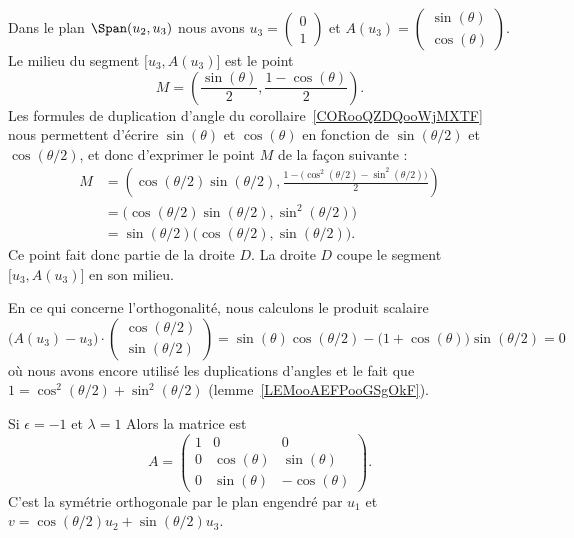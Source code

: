 \begin{subproof}
    Dans le plan \( \Span(u_2,u_3)\) nous avons \( u_3=\begin{pmatrix}
        0    \\
        1
    \end{pmatrix}\) et \( A(u_3)=\begin{pmatrix}
        \sin(\theta)    \\
        \cos(\theta)
    \end{pmatrix}\). Le milieu du segment \( \mathopen[ u_3 , A(u_3) \mathclose]\) est le point
    \begin{equation}
        M=\left( \frac{ \sin(\theta) }{2},\frac{ 1-\cos(\theta) }{2} \right).
    \end{equation}
    Les formules de duplication d'angle du corollaire~\ref{CORooQZDQooWjMXTF} nous permettent d'écrire \( \sin(\theta)\) et \( \cos(\theta)\) en fonction de \( \sin(\theta/2)\) et \( \cos(\theta/2)\), et donc d'exprimer le point \( M\) de la façon suivante :
    \begin{subequations}
        \begin{align}
            M&=\left( \cos(\theta/2)\sin(\theta/2),\frac{ 1-\big( \cos^2(\theta/2)-\sin^2(\theta/2) \big) }{2} \right)\\
            &=\big( \cos(\theta/2)\sin(\theta/2),\sin^2(\theta/2) \big)\\
            &=\sin(\theta/2)\big( \cos(\theta/2),\sin(\theta/2) \big).
        \end{align}
    \end{subequations}
    Ce point fait donc partie de la droite \( D\). La droite \( D\) coupe le segment \( \mathopen[ u_3 , A(u_3) \mathclose]\) en son milieu.

    En ce qui concerne l'orthogonalité, nous calculons le produit scalaire
    \begin{equation}
            \big( A(u_3)-u_3 \big)\cdot\begin{pmatrix}
                \cos(\theta/2)    \\
                \sin(\theta/2)
            \end{pmatrix}
            =\sin(\theta)\cos(\theta/2)-\big( 1+\cos(\theta) \big)\sin(\theta/2)=0
    \end{equation}
    où nous avons encore utilisé les duplications d'angles et le fait que \( 1=\cos^2(\theta/2)+\sin^2(\theta/2)\) (lemme~\ref{LEMooAEFPooGSgOkF}).

    \item[Si \( \epsilon=-1\) et \( \lambda=1\)] Alors la matrice est
        \begin{equation}
            A=\begin{pmatrix}
                1    &   0    &   0    \\
                0    &   \cos(\theta)    &   \sin(\theta)    \\
                0    &   \sin(\theta)    &   -\cos(\theta)
            \end{pmatrix}.
        \end{equation}
        C'est la symétrie orthogonale par le plan engendré par \( u_1\) et \( v=\cos(\theta/2)u_2+\sin(\theta/2)u_3\).


\end{subproof}
